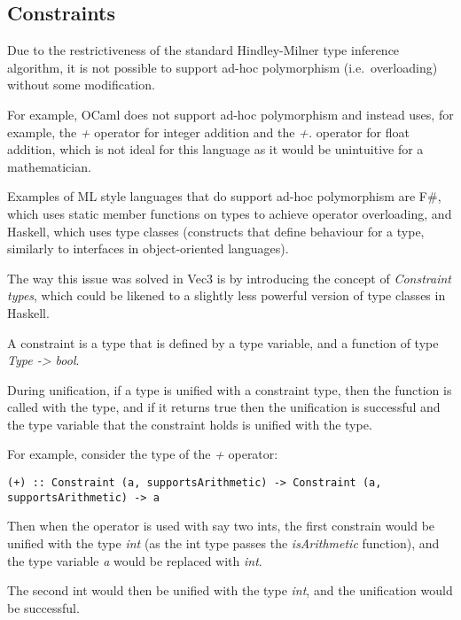 \subsection{Constraints}\label{subsec:constraints}

Due to the restrictiveness of the standard Hindley-Milner type inference algorithm, it is not possible to support ad-hoc
polymorphism (i.e.\ overloading) without some modification.

For example, OCaml\citep{ocamlDocs} does not support ad-hoc polymorphism and instead uses, for example, the \textit{+}
operator for integer addition and the \textit{+.} operator for float addition, which is not ideal for this language 
as it would be unintuitive for a mathematician.

Examples of ML style languages that do support ad-hoc polymorphism are F\#, which uses static member functions on 
types to achieve operator overloading\citep{fsharpdocs}, and Haskell, which uses type classes
\citep{haskellDocs} (constructs that define behaviour for a type, similarly to interfaces in object-oriented languages).

The way this issue was solved in Vec3 is by introducing the concept of \textit{Constraint types}, which could be 
likened to a slightly less powerful version of type classes in Haskell.

A constraint is a type that is defined by a type variable, and a function of type \textit{Type -> bool}.

During unification, if a type is unified with a constraint type, then the function is called with the type, and if it
returns true then the unification is successful and the type variable that the constraint holds is unified with the
type.

For example, consider the type of the \textit{+} operator:

\begin{verbatim}
(+) :: Constraint (a, supportsArithmetic) -> Constraint (a, supportsArithmetic) -> a
\end{verbatim}

Then when the operator is used with say two ints, the first constrain would be unified with the type 
\textit{int} (as the int type passes the \textit{isArithmetic} function), and the type variable \textit{a} would be 
replaced with \textit{int}.

The second int would then be unified with the type \textit{int}, and the unification would be successful.


